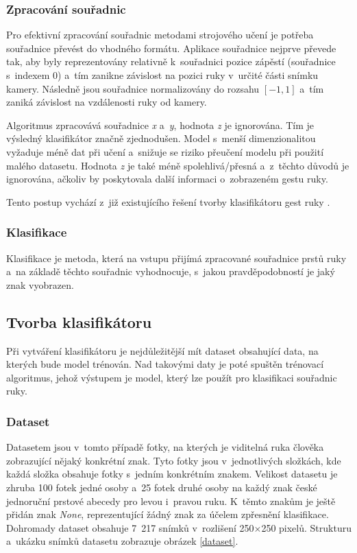 \documentclass[
  master,
  program=ainfvs,
  biblatex,
  figures=true,
  tables=false,
  sourcecodes=true,
  glossaries,
  index
]{kidiplom}
\begin{document}
        \subsubsection{Zpracování souřadnic} \label{zpracovani-souradnic}
            Pro efektivní zpracování souřadnic metodami strojového učení je potřeba souřadnice převést do vhodného formátu. Aplikace souřadnice nejprve převede tak, aby byly reprezentovány relativně k~souřadnici pozice zápěstí (souřadnice s~indexem 0) a~tím zanikne závislost na pozici ruky v~určité části snímku kamery. Následně jsou souřadnice normalizovány do rozsahu $[-1, 1]$ a~tím zaniká závislost na vzdálenosti ruky od kamery. 

              Algoritmus zpracovává souřadnice \emph{x} a~\emph{y}, hodnota \emph{z} je ignorována. Tím je výsledný klasifikátor značně zjednodušen. Model s~menší dimenzionalitou vyžaduje méně dat při učení a~snižuje se riziko přeučení modelu při použití malého datasetu. Hodnota \emph{z} je také méně spolehlivá/přesná a~z~těchto důvodů je ignorována, ačkoliv by poskytovala další informaci o~zobrazeném gestu ruky. 
          
          Tento postup vychází z~již existujícího řešení tvorby klasifikátoru gest ruky \cite{mediapipe-example}.
           
        \subsubsection{Klasifikace}
            Klasifikace je metoda, která na vstupu přijímá zpracované souřadnice prstů ruky a~na základě těchto souřadnic vyhodnocuje, s~jakou pravděpodobností je jaký znak vyobrazen.
            
    
    \subsection{Tvorba klasifikátoru}
        Při vytváření klasifikátoru je nejdůležitější mít dataset obsahující data, na kterých bude model trénován. Nad takovými daty je poté spuštěn trénovací algoritmus, jehož výstupem je model, který lze použít pro klasifikaci souřadnic ruky.

        \subsubsection{Dataset}
            Datasetem jsou v~tomto případě fotky, na kterých je viditelná ruka člověka zobrazující nějaký konkrétní znak. Tyto fotky jsou v~jednotlivých složkách, kde každá složka obsahuje fotky s~jedním konkrétním znakem. Velikost datasetu je zhruba 100 fotek jedné osoby a~25 fotek druhé osoby na každý znak české jednoruční prstové abecedy pro levou i~pravou ruku. K~těmto znakům je ještě přidán znak \emph{None}, reprezentující žádný znak za účelem zpřesnění klasifikace. Dohromady dataset obsahuje 7~217 snímků v~rozlišení 250\(\times\)250 pixelů. Strukturu a~ukázku snímků datasetu zobrazuje obrázek \ref{dataset}.
\end{document}
